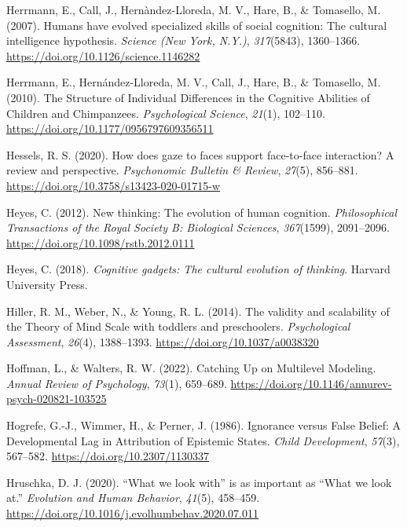 \documentclass[
]{scrbook}
\newlength{\cslhangindent}
\newenvironment{CSLReferences}[2] %
 {\begin{list}{}{%
  \setlength{\itemindent}{0pt}
  \setlength{\leftmargin}{0pt}
  \setlength{\parsep}{0pt}
  \ifodd #1
   \setlength{\leftmargin}{\cslhangindent}
   \setlength{\itemindent}{-1\cslhangindent}
  \fi
  \setlength{\itemsep}{#2\baselineskip}}}
 {\end{list}}
\begin{document}
\begin{CSLReferences}{1}{0}
Herrmann, E., Call, J., Hernàndez-Lloreda, M. V., Hare, B., \& Tomasello, M. (2007). Humans have evolved specialized skills of social cognition: The cultural intelligence hypothesis. \emph{Science (New York, N.Y.)}, \emph{317}(5843), 1360--1366. \url{https://doi.org/10.1126/science.1146282}

Herrmann, E., Hernández-Lloreda, M. V., Call, J., Hare, B., \& Tomasello, M. (2010). The {Structure} of {Individual Differences} in the {Cognitive Abilities} of {Children} and {Chimpanzees}. \emph{Psychological Science}, \emph{21}(1), 102--110. \url{https://doi.org/10.1177/0956797609356511}

Hessels, R. S. (2020). How does gaze to faces support face-to-face interaction? {A} review and perspective. \emph{Psychonomic Bulletin \& Review}, \emph{27}(5), 856--881. \url{https://doi.org/10.3758/s13423-020-01715-w}

Heyes, C. (2012). New thinking: The evolution of human cognition. \emph{Philosophical Transactions of the Royal Society B: Biological Sciences}, \emph{367}(1599), 2091--2096. \url{https://doi.org/10.1098/rstb.2012.0111}

Heyes, C. (2018). \emph{Cognitive gadgets: {The} cultural evolution of thinking}. Harvard University Press.

Hiller, R. M., Weber, N., \& Young, R. L. (2014). The validity and scalability of the {Theory} of {Mind Scale} with toddlers and preschoolers. \emph{Psychological Assessment}, \emph{26}(4), 1388--1393. \url{https://doi.org/10.1037/a0038320}

Hoffman, L., \& Walters, R. W. (2022). Catching {Up} on {Multilevel Modeling}. \emph{Annual Review of Psychology}, \emph{73}(1), 659--689. \url{https://doi.org/10.1146/annurev-psych-020821-103525}

Hogrefe, G.-J., Wimmer, H., \& Perner, J. (1986). Ignorance versus {False Belief}: {A Developmental Lag} in {Attribution} of {Epistemic States}. \emph{Child Development}, \emph{57}(3), 567--582. \url{https://doi.org/10.2307/1130337}

Hruschka, D. J. (2020). {``{What} we look with''} is as important as {``{What} we look at.''} \emph{Evolution and Human Behavior}, \emph{41}(5), 458--459. \url{https://doi.org/10.1016/j.evolhumbehav.2020.07.011}


\end{CSLReferences}
\end{document}
